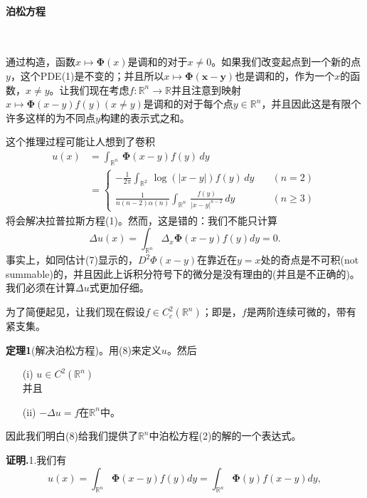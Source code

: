 \documentclass[leqno]{article}
\numberwithin{equation}{subsection}%
\begin{document}
\paragraph{泊松方程}~{}
\par
通过构造，函数$x\mapsto\bm{\Phi}(x)$是调和的对于$x\neq 0$。如果我们改变起点到一个新的点$y$，这个PDE(1)是不变的；并且所以$x\mapsto\bm{\Phi(x-y)}$也是调和的，作为一个$x$的函数，$x\neq y$。让我们现在考虑$f:\mathbb{R}^{n}\rightarrow\mathbb{R}$并且注意到映射$x\mapsto\bm{\Phi}(x-y)f(y)(x\neq y)$是调和的对于每个点$y\in\mathbb{R}^{n}$，并且因此这是有限个许多这样的为不同点$y$构建的表示式之和。
\par
这个推理过程可能让人想到了卷积
\begin{equation}
\begin{aligned}
u(x)&=\int_{\mathbb{R}^{n}}\,\bm{\Phi}(x-y)f(y)\,dy\\
&=
\begin{cases}
-\frac{1}{2\pi}\int_{\mathbb{R}^{2}}\,\log(|x-y|)f(y)\,dy\quad &(n=2)\\
\frac{1}{n(n-2)\alpha(n)}\int_{\mathbb{R}^{n}}\,\frac{f(y)}{|x-y|^{n-2}}\,dy&(n\geq 3)
\end{cases}
\end{aligned}
\end{equation}
将会解决拉普拉斯方程(1)。然而，这是错的：我们不能只计算
\begin{equation}
\Delta u(x)=\int_{\mathbb{R}^{n}}\Delta_{x}\bm{\Phi}(x-y)f(y)dy=0.
\end{equation}
事实上，如同估计(7)显示的，$D^{2}\Phi(x-y)$在靠近在$y=x$处的奇点是不可积(not summable)的，并且因此上诉积分符号下的微分是没有理由的(并且是不正确的)。我们必须在计算$\Delta u$式更加仔细。
\par
为了简便起见，让我们现在假设$f\in C_{c}^{2}(\mathbb{R}^{n})$；即是，$f$是两阶连续可微的，带有紧支集。
\par
\noindent\textbf{定理1}(解决泊松方程)。用(8)来定义$u$。然后
\begin{enumerate}[fullwidth,itemindent=2em]
	\item[(i)]$u\in C^{2}(\mathbb{R}^{n})$ \\
	并且\vspace{-2ex}
	\item[(ii)]$-\Delta  u=f$在$\mathbb{R}^{n}$中。
\end{enumerate}
\par
因此我们明白(8)给我们提供了$\mathbb{R}^{n}$中泊松方程(2)的解的一个表达式。
\par
\noindent\textbf{证明.}1.我们有
\begin{equation*}
u(x)=\int_{\mathbb{R}^{n}}\bm{\Phi}(x-y)f(y)dy=\int_{\mathbb{R}^{n}}\bm{\Phi}(y)f(x-y)dy,
\end{equation*}
\end{document}
